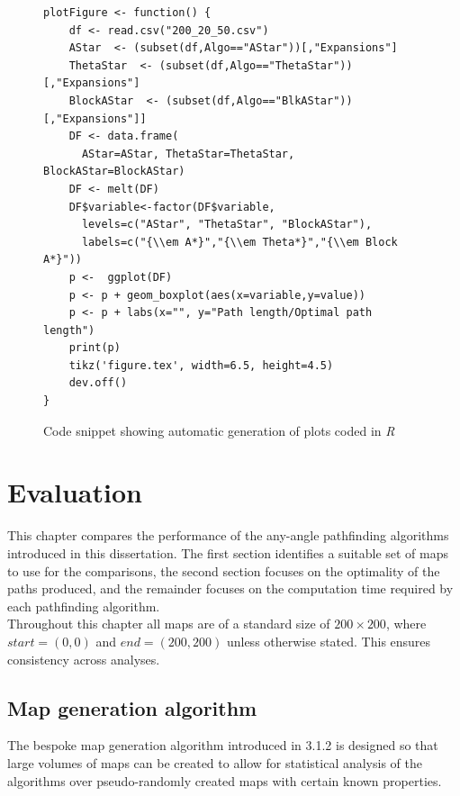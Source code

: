 \documentclass[12pt,notitlepage]{report}
\begin{document}
\begin{figure}
\begin{lstlisting}
plotFigure <- function() {
    df <- read.csv("200_20_50.csv")
    AStar  <- (subset(df,Algo=="AStar"))[,"Expansions"]
    ThetaStar  <- (subset(df,Algo=="ThetaStar"))[,"Expansions"]
    BlockAStar  <- (subset(df,Algo=="BlkAStar"))[,"Expansions"]] 
    DF <- data.frame(
      AStar=AStar, ThetaStar=ThetaStar, BlockAStar=BlockAStar)
    DF <- melt(DF)
    DF$variable<-factor(DF$variable,
      levels=c("AStar", "ThetaStar", "BlockAStar"),
      labels=c("{\\em A*}","{\\em Theta*}","{\\em Block A*}"))   
    p <-  ggplot(DF)
    p <- p + geom_boxplot(aes(x=variable,y=value))
    p <- p + labs(x="", y="Path length/Optimal path length")
    print(p)
    tikz('figure.tex', width=6.5, height=4.5)
    dev.off()
}
\end{lstlisting}
\caption{Code snippet showing automatic generation of plots coded in {\em R}}
\end{figure}

\chapter{Evaluation}

This chapter compares the performance of the any-angle pathfinding algorithms introduced in this dissertation. The first section identifies a suitable set of maps to use for the comparisons, the second section focuses on the optimality of the paths produced, and the remainder focuses on the computation time required by each pathfinding algorithm.\\

\noindent
Throughout this chapter all maps are of a standard size of $200 \times 200$, where $start=(0,0)$ and $end=(200,200)$ unless otherwise stated. This ensures consistency across analyses.

\section{Map generation algorithm}

The bespoke map generation algorithm introduced in 3.1.2 is designed so that large volumes of maps can be created to allow for statistical analysis of the algorithms over pseudo-randomly created maps with certain known properties.\\
\end{document}
